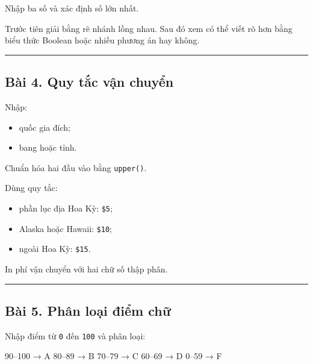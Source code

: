 \documentclass[
  11pt,
  a4paper,
]{article}
\newenvironment{Shaded}{}{}
\newcommand{\NormalTok}[1]{#1}
\providecommand{\tightlist}{%
  \setlength{\itemsep}{0pt}\setlength{\parskip}{0pt}}
\begin{document}
Nhập ba số và xác định số lớn nhất.

Trước tiên giải bằng rẽ nhánh lồng nhau. Sau đó xem có thể viết rõ hơn
bằng biểu thức Boolean hoặc nhiều phương án hay không.

\begin{center}\rule{0.5\linewidth}{0.5pt}\end{center}

\subsection{Bài 4. Quy tắc vận
chuyển}\label{buxe0i-4.-quy-tux1eafc-vux1eadn-chuyux1ec3n}

Nhập:

\begin{itemize}
\tightlist
\item
  quốc gia đích;
\item
  bang hoặc tỉnh.
\end{itemize}

Chuẩn hóa hai đầu vào bằng \texttt{upper()}.

Dùng quy tắc:

\begin{itemize}
\tightlist
\item
  phần lục địa Hoa Kỳ: \texttt{\$5};
\item
  Alaska hoặc Hawaii: \texttt{\$10};
\item
  ngoài Hoa Kỳ: \texttt{\$15}.
\end{itemize}

In phí vận chuyển với hai chữ số thập phân.

\begin{center}\rule{0.5\linewidth}{0.5pt}\end{center}

\subsection{Bài 5. Phân loại điểm
chữ}\label{buxe0i-5.-phuxe2n-loux1ea1i-ux111iux1ec3m-chux1eef}

Nhập điểm từ \texttt{0} đến \texttt{100} và phân loại:

\begin{Shaded}
\begin{Highlighting}[]
\NormalTok{90–100 → A}
\NormalTok{80–89  → B}
\NormalTok{70–79  → C}
\NormalTok{60–69  → D}
\NormalTok{0–59   → F}
\end{Highlighting}
\end{Shaded}
\end{document}
